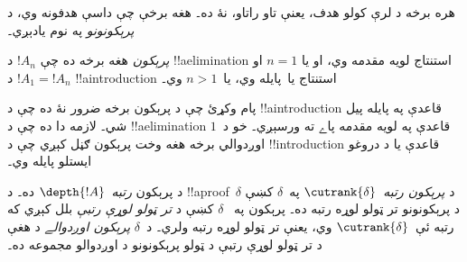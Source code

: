 \documentclass[../../../include/open-logic-section]{subfiles}
\begin{document}
هره برخه د لرې کولو هدف، يعنې تاو راتاو، نۀ ده۔ هغه
برخې چې داسې هدفونه وي، د \emph{پرېکونونو} په نوم يادېږي۔

\begin{defn}
\emph{پرېکون} هغه برخه ده چې $!A_n$ د !!a{elimination}
استنتاج لويه مقدمه وي، او يا $n=1$ او $!A_1 = !A_n$ د
!!a{introduction} استنتاج يا~\FalseInt پايله وي، يا~$n>1$
وي۔
\end{defn}

پام وکړئ چې د پرېکون برخه ضرور نۀ ده چې د
!!a{introduction} قاعدې په پايله پيل شي۔ لازمه دا ده چې
د !!a{elimination} قاعدې په لويه مقدمه پاے ته ورسېږي۔ خو
د~$1$ اوږدوالي برخه هغه وخت پرېکون ګڼل کېږي چې د
!!{introduction} قاعدې يا د دروغو ايستلو پايله وي۔

\begin{defn}
د پرېکون \emph{رتبه}~$\depth{!A}$ ده۔ د
!!a{proof}~$\delta$ د \emph{پرېکون رتبه}~$\cutrank{\delta}$
په~$\delta$ کښې د پرېکونونو تر ټولو لوړه رتبه ده۔ پرېکون په
~$\delta$ کښې د \emph{تر ټولو لوړې رتبې} بلل کېږي که رتبه
ئې~$\cutrank{\delta}$ وي، يعنې تر ټولو لوړه رتبه ولري۔
د~$\delta$ \emph{پرېکون اوږدوالے} د هغې د تر ټولو لوړې رتبې
د ټولو پرېکونونو د اوږدوالو مجموعه ده۔
\end{defn}
\end{document}
